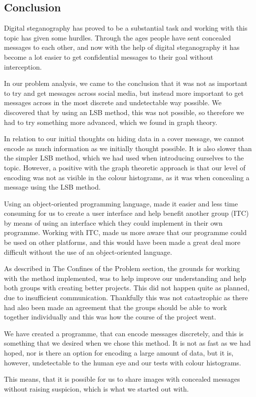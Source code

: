 \subsection{Conclusion}
Digital steganography has proved to be a substantial task and working with this topic has given some hurdles. Through the ages people have sent concealed messages to each other, and now with the help of digital steganography it has become a lot easier to get confidential messages to their goal without interception.

In our problem analysis, we came to the conclusion that it was not as important to try and get messages across social media, but instead more important to get messages across in the most discrete and undetectable way possible. We discovered that by using an LSB method, this was not possible, so therefore we had to try something more advanced, which we found in graph theory.
 
In relation to our initial thoughts on hiding data in a cover message, we cannot encode as much information as we initially thought possible. It is also slower than the simpler LSB method, which we had used when introducing ourselves to the topic. However, a positive with the graph theoretic approach is that our level of encoding was not as visible in the colour histograms, as it was when concealing a message using the LSB method.

Using an object-oriented programming language, made it easier and less time consuming for us to create a user interface and help benefit another group (ITC) by means of using an interface which they could implement in their own programme. Working with ITC, made us more aware that our programme could be used on other platforms, and this would have been made a great deal more difficult without the use of an object-oriented language.

As described in The Confines of the Problem section, the grounds for working with the method implemented, was to help improve our understanding and help both groups with creating better projects. This did not happen quite as planned, due to insufficient communication. Thankfully this was not catastrophic as there had also been made an agreement that the groups should be able to work together individually and this was how the course of the project went.

We have created a programme, that can encode messages discretely, and this is something that we desired when we chose this method. It is not as fast as we had hoped, nor is there an option for encoding a large amount of data, but it is, however, undetectable to the human eye and our tests with colour histograms.

This means, that it is possible for us to share images with concealed messages without raising suspicion, which is what we started out with.